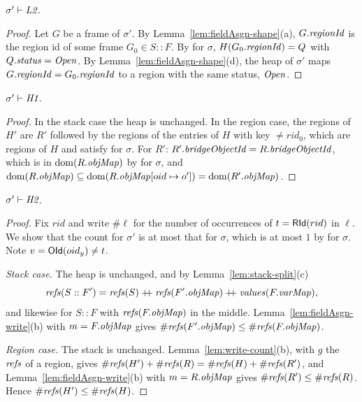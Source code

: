 \begin{lemma}[\inv{L2}] 
$\sigma' \vdash \textit{L2}$.
\end{lemma}
\begin{proof}
Let $G$ be a frame of $\sigma'$. By Lemma~\ref{lem:fieldAsgn-shape}(a), $G.\mathit{regionId}$ is the region id of
some frame $G_0 \in S :: F$. By  for $\sigma$, $H(G_0.\mathit{regionId}) = Q$ with $Q.\mathit{status} = \mathit{Open}$. By
Lemma~\ref{lem:fieldAsgn-shape}(d), the heap of $\sigma'$ maps $G.\mathit{regionId} = G_0.\mathit{regionId}$ to a region with
the same status, $\mathit{Open}$.
\end{proof}

\begin{lemma}[\inv{H1}] 
$\sigma' \vdash \textit{H1}$.
\end{lemma}
\begin{proof}
In the stack case the heap is unchanged. In the region case, the regions of $H'$ are $R'$ followed by
the regions of the entries of $H$ with key $\ne rid_0$, which are regions of $H$ and satisfy 
for $\sigma$. For $R'$: $R'.\mathit{bridgeObjectId} = R.\mathit{bridgeObjectId}$, which is in $\mathrm{dom}(R.\mathit{objMap})$ by  for
$\sigma$, and $\mathrm{dom}(R.\mathit{objMap}) \subseteq \mathrm{dom}(R.\mathit{objMap}[oid \mapsto o']) = \mathrm{dom}(R'.\mathit{objMap})$.
\end{proof}

\begin{lemma}[\inv{H2}] 
$\sigma' \vdash \textit{H2}$.
\end{lemma}
\begin{proof}
Fix $rid$ and write $\#\ell$ for the number of occurrences of $t = \mathsf{RId}(rid)$ in $\ell$. We show that
the count for $\sigma'$ is at most that for $\sigma$, which is at most $1$ by  for $\sigma$.
Note $v = \mathsf{OId}(oid_y) \ne t$.

\emph{Stack case.} The heap is unchanged, and by Lemma~\ref{lem:stack-split}(c)
\[ \mathit{refs}(S :: F') = \mathit{refs}(S) \mathbin{+\!\!+} \mathit{refs}(F'.\mathit{objMap}) \mathbin{+\!\!+} \mathit{values}(F.\mathit{varMap}), \]
and likewise for $S :: F$ with $\mathit{refs}(F.\mathit{objMap})$ in the middle. Lemma~\ref{lem:fieldAsgn-write}(b)
with $m = F.\mathit{objMap}$ gives $\#\mathit{refs}(F'.\mathit{objMap}) \le \#\mathit{refs}(F.\mathit{objMap})$.

\emph{Region case.} The stack is unchanged. Lemma~\ref{lem:write-count}(b), with $g$ the $\mathit{refs}$ of a
region, gives $\#\mathit{refs}(H') + \#\mathit{refs}(R) = \#\mathit{refs}(H) + \#\mathit{refs}(R')$, and
Lemma~\ref{lem:fieldAsgn-write}(b) with $m = R.\mathit{objMap}$ gives $\#\mathit{refs}(R') \le \#\mathit{refs}(R)$. Hence
$\#\mathit{refs}(H') \le \#\mathit{refs}(H)$.
\end{proof}

